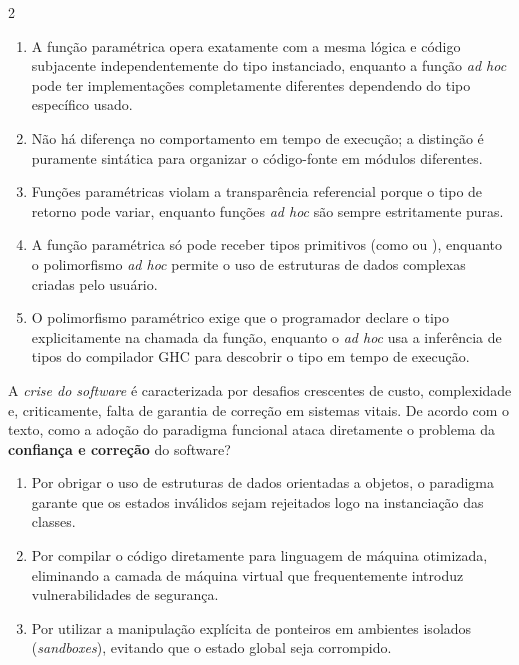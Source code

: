 \documentclass[a4paper,10pt,brazil]{article}
\begin{document}
\begin{multicols}{2}
\begin{enumerate}
  \item A função paramétrica opera exatamente com a mesma lógica e código subjacente independentemente do tipo instanciado, enquanto a função \emph{ad hoc} pode ter implementações completamente diferentes dependendo do tipo específico usado.

  \item Não há diferença no comportamento em tempo de execução; a distinção é puramente sintática para organizar o código-fonte em módulos diferentes.

  \item Funções paramétricas violam a transparência referencial porque o tipo de retorno pode variar, enquanto funções \emph{ad hoc} são sempre estritamente puras.

  \item A função paramétrica só pode receber tipos primitivos (como  ou ), enquanto o polimorfismo \emph{ad hoc} permite o uso de estruturas de dados complexas criadas pelo usuário.

  \item O polimorfismo paramétrico exige que o programador declare o tipo explicitamente na chamada da função, enquanto o \emph{ad hoc} usa a inferência de tipos do compilador GHC para descobrir o tipo em tempo de execução.


\end{enumerate}

A \emph{crise do software} é caracterizada por desafios crescentes de custo, complexidade e, criticamente, falta de garantia de correção em sistemas vitais. De acordo com o texto, como a adoção do paradigma funcional ataca diretamente o problema da \textbf{confiança e correção} do software?

\begin{enumerate}
  \item Por obrigar o uso de estruturas de dados orientadas a objetos, o paradigma garante que os estados inválidos sejam rejeitados logo na instanciação das classes.

  \item Por compilar o código diretamente para linguagem de máquina otimizada, eliminando a camada de máquina virtual que frequentemente introduz vulnerabilidades de segurança.

  \item Por utilizar a manipulação explícita de ponteiros em ambientes isolados (\emph{sandboxes}), evitando que o estado global seja corrompido.


\end{enumerate}
\end{multicols}
\end{document}
